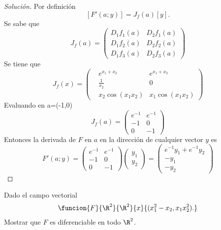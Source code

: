 \documentclass[a4,11pt]{aleph-notas}
\begin{document}
\begin{proof}[Solución]
Por definición
	\[
        [F'(a;y)]=J_f(a)[y].
    \]
	Se sabe que
    \[
        J_f(a)=\left( \begin{array}{lcr}
        D_{1}f_1(a)    &D_{2}f_1(a) \\
        D_{1}f_2(a)    &D_{2}f_2(a)\\
        D_{1}f_3(a)    &D_{2}f_3(a)
        \end{array}\right) 
    \]
    Se tiene que    
    \[
        J_f(x)= \begin{pmatrix}
        & e^{x_1+x_2}    &e^{x_1+x_2} \\
        & \frac{1}{x_2}  &0\\
        & x_2\cos(x_1x_2)    &x_1\cos(x_1x_2)
        \end{pmatrix} 
    \]
    Evaluando en a=(-1,0)
    \[
        J_f(a)= \begin{pmatrix}
        e^{-1} &e^{-1} \\
        -1     &0\\
        0      &-1
        \end{pmatrix}  
    \]
    Entonces la derivada de $F$ en $a$ en la dirección de cualquier vector $y$  es
    \[
        F'(a;y)= \begin{pmatrix}
        e^{-1} &e^{-1} \\
        -1     &0\\
        0      &-1
        \end{pmatrix}  
        \begin{pmatrix}
        y_1  \\
        y_2  
        \end{pmatrix}= 
        \begin{pmatrix}
        e^{-1}y_1+e^{-1}y_2\\
        -y_1     \\
        -y_2     
        \end{pmatrix} 
    \]
\end{proof}

\begin{ejer}
Dado el campo vectorial
	\[
		\funcion{F}{\R^2}{\R^2}{x}{(x_1^2-x_2,x_1x_2^2).}
	\]
	Mostrar que $F$ es diferenciable en todo $\R^2$.
\end{ejer}
\end{document}
